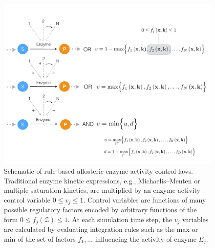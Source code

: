 \documentclass[12pt]{article}
\begin{document}
\begin{figure}
\centering
\includegraphics[width=1.0\textwidth]{./figs/Figure-2-ControlSchematic.pdf}
\caption{Schematic of rule-based allosteric enzyme activity control laws. 
Traditional enzyme kinetic expressions, e.g., Michaelis–Menten or multiple saturation kinetics, are multiplied by an enzyme activity control variable $0 \leq v_{j} \leq 1 $. 
Control variables are functions of many possible regulatory factors encoded by arbitrary functions of the form $0\leq f_{j}\left(\mathcal{Z}\right)\leq 1$.
At each simulation time step, the $v_{j}$ variables are calculated by evaluating integration rules such as the max or min of the set of factors $f_{1},\hdots$ 
influencing the activity of enzyme $E_{j}$. }\label{fig-control-schematic}
\end{figure}

\clearpage
\end{document}
